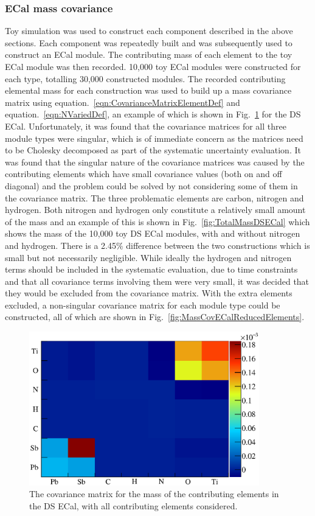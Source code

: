 \subsubsection{ECal mass covariance}
\label{subsubsec:ECalMassCovariance}
Toy simulation was used to construct each component described in the above sections.  Each component was repeatedly built and was subsequently used to construct an ECal module.  The contributing mass of each element to the toy ECal module was then recorded.  10,000 toy ECal modules were constructed for each type, totalling 30,000 constructed modules.  The recorded contributing elemental mass for each construction was used to build up a mass covariance matrix using equation.~\ref{eqn:CovarianceMatrixElementDef} and equation.~\ref{eqn:NVariedDef}, an example of which is shown in Fig.~\ref{fig:MassCovDSECalAllElements} for the DS ECal.  Unfortunately, it was found that the covariance matrices for all three module types were singular, which is of immediate concern as the matrices need to be Cholesky decomposed as part of the systematic uncertainty evaluation.  It was found that the singular nature of the covariance matrices was caused by the contributing elements which have small covariance values (both on and off diagonal) and the problem could be solved by not considering some of them in the covariance matrix.  The three problematic elements are carbon, nitrogen and hydrogen.  Both nitrogen and hydrogen only constitute a relatively small amount of the mass and an example of this is shown in Fig.~\ref{fig:TotalMassDSECal} which shows the mass of the 10,000 toy DS ECal modules, with and without nitrogen and hydrogen.  There is a 2.45$\%$ difference between the two constructions which is small but not necessarily negligible.  While ideally the hydrogen and nitrogen terms should be included in the systematic evaluation, due to time constraints and that all covariance terms involving them were very small, it was decided that they would be excluded from the covariance matrix.  With the extra elements excluded, a non-singular covariance matrix for each module type could be constructed, all of which are shown in Fig.~\ref{fig:MassCovECalReducedElements}.
\begin{figure}
  \centering
  \includegraphics[width=10cm]{images/measurement/systematics/detector/mass/MassCov_DSECal_AllElements.eps}
  \caption{The covariance matrix for the mass of the contributing elements in the DS ECal, with all contributing elements considered.}
  \label{fig:MassCovDSECalAllElements}
\end{figure}
